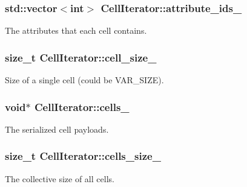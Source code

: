 \subsubsection[{attribute\+\_\+ids\+\_\+}]{\setlength{\rightskip}{0pt plus 5cm}std\+::vector$<$int$>$ Cell\+Iterator\+::attribute\+\_\+ids\+\_\+\hspace{0.3cm}{\ttfamily [private]}}\label{classCellIterator_a9350df288a8389c1ca6ae5d3fd9d3151}
The attributes that each cell contains. \hypertarget{classCellIterator_a9508e436eb1f4ce94067a4ad98deb5b5}{}
\subsubsection[{cell\+\_\+size\+\_\+}]{\setlength{\rightskip}{0pt plus 5cm}size\+\_\+t Cell\+Iterator\+::cell\+\_\+size\+\_\+\hspace{0.3cm}{\ttfamily [private]}}\label{classCellIterator_a9508e436eb1f4ce94067a4ad98deb5b5}
Size of a single cell (could be V\+A\+R\+\_\+\+S\+I\+Z\+E). \hypertarget{classCellIterator_a9c30b2f2d06ab4ea835ef7717d50c205}{}
\subsubsection[{cells\+\_\+}]{\setlength{\rightskip}{0pt plus 5cm}void$\ast$ Cell\+Iterator\+::cells\+\_\+\hspace{0.3cm}{\ttfamily [private]}}\label{classCellIterator_a9c30b2f2d06ab4ea835ef7717d50c205}
The serialized cell payloads. \hypertarget{classCellIterator_ab2dbfd9302f32f6a4b040ad723a9e989}{}
\subsubsection[{cells\+\_\+size\+\_\+}]{\setlength{\rightskip}{0pt plus 5cm}size\+\_\+t Cell\+Iterator\+::cells\+\_\+size\+\_\+\hspace{0.3cm}{\ttfamily [private]}}\label{classCellIterator_ab2dbfd9302f32f6a4b040ad723a9e989}
The collective size of all cells. \hypertarget{classCellIterator_a0b564d0f71aec08b0d5e1e89565d4f13}{}
